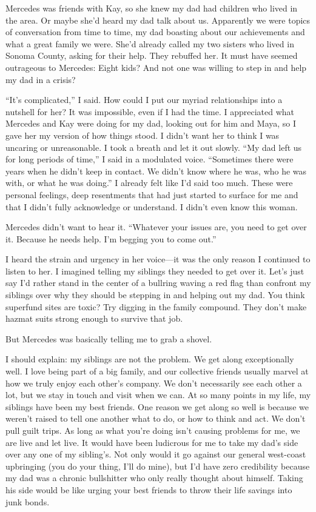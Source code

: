 \documentclass[12pt]{book}
\begin{document}
Mercedes was friends with Kay, so she knew my dad had children who lived in the area. Or maybe she'd heard my dad talk about us. Apparently we were topics of conversation from time to time, my dad boasting about our achievements and what a great family we were. She'd already called my two sisters who lived in Sonoma County, asking for their help. They rebuffed her. It must have seemed outrageous to Mercedes: Eight kids? And not one was willing to step in and help my dad in a crisis?

``It's complicated,'' I said. How could I put our myriad relationships into a nutshell for her? It was impossible, even if I had the time. I appreciated what Mercedes and Kay were doing for my dad, looking out for him and Maya, so I gave her my version of how things stood. I didn't want her to think I was uncaring or unreasonable. I took a breath and let it out slowly. ``My dad left us for long periods of time,'' I said in a modulated voice. ``Sometimes there were years when he didn't keep in contact. We didn't know where he was, who he was with, or what he was doing.'' I already felt like I'd said too much. These were personal feelings, deep resentments that had just started to surface for me and that I didn't fully acknowledge or understand. I didn't even know this woman.

Mercedes didn't want to hear it. ``Whatever your issues are, you need to get over it. Because he needs help. I'm begging you to come out.''

I heard the strain and urgency in her voice---it was the only reason I continued to listen to her. I imagined telling my siblings they needed to get over it. Let's just say I'd rather stand in the center of a bullring waving a red flag than confront my siblings over why they should be stepping in and helping out my dad. You think superfund sites are toxic? Try digging in the family compound. They don't make hazmat suits strong enough to survive that job.

But Mercedes was basically telling me to grab a shovel.

I should explain: my siblings are not the problem. We get along exceptionally well. I love being part of a big family, and our collective friends usually marvel at how we truly enjoy each other's company. We don't necessarily see each other a lot, but we stay in touch and visit when we can. At so many points in my life, my siblings have been my best friends. One reason we get along so well is because we weren't raised to tell one another what to do, or how to think and act. We don't pull guilt trips. As long as what you're doing isn't causing problems for me, we are live and let live. It would have been ludicrous for me to take my dad's side over any one of my sibling's. Not only would it go against our general west-coast upbringing (you do your thing, I'll do mine), but I'd have zero credibility because my dad was a chronic bullshitter who only really thought about himself. Taking his side would be like urging your best friends to throw their life savings into junk bonds.
\end{document}
